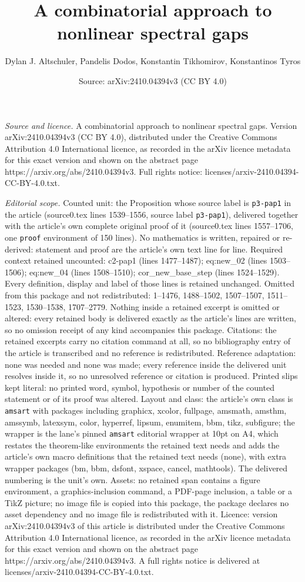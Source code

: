 \documentclass[10pt,a4paper]{amsart}
\title[A combinatorial approach to nonlinear spectral gaps]{A combinatorial approach to nonlinear spectral gaps}
\author{Dylan J. Altschuler, Pandelis Dodos, Konstantin Tikhomirov, Konstantinos Tyros}
\date{Source: arXiv:2410.04394v3 (CC BY 4.0)}
\begin{document}
\maketitle

\noindent\emph{Source and licence.} A combinatorial approach to nonlinear spectral gaps. Version arXiv:2410.04394v3 (CC BY 4.0), distributed under the Creative Commons Attribution 4.0 International licence, as recorded in the arXiv licence metadata for this exact version and shown on the abstract page https://arxiv.org/abs/2410.04394v3. Full rights notice: licenses/arxiv-2410.04394-CC-BY-4.0.txt.\par\smallskip

\noindent\textit{Editorial scope.} Counted unit: the Proposition whose source label is \texttt{p3-pap1} in the article (source0.tex lines 1539--1556, source label \texttt{p3-pap1}), delivered together with the article's own complete original proof of it (source0.tex lines 1557--1706, one \texttt{proof} environment of 150 lines). No mathematics is written, repaired or re-derived: statement and proof are the article's own text line for line. Required context retained uncounted: c2-pap1 (lines 1477--1487); eq:new\_02 (lines 1503--1506); eq:new\_04 (lines 1508--1510); cor\_new\_base\_step (lines 1524--1529). Every definition, display and label of those lines is retained unchanged. Omitted from this package and not redistributed: 1--1476, 1488--1502, 1507--1507, 1511--1523, 1530--1538, 1707--2779. Nothing inside a retained excerpt is omitted or altered: every retained body is delivered exactly as the article's lines are written, so no omission receipt of any kind accompanies this package. Citations: the retained excerpts carry no citation command at all, so no bibliography entry of the article is transcribed and no reference is redistributed. Reference adaptation: none was needed and none was made; every reference inside the delivered unit resolves inside it, so no unresolved reference or citation is produced. Printed slips kept literal: no printed word, symbol, hypothesis or number of the counted statement or of its proof was altered. Layout and class: the article's own class is \texttt{amsart} with packages including graphicx, xcolor, fullpage, amsmath, amsthm, amssymb, latexsym, color, hyperref, lipsum, enumitem, bbm, tikz, subfigure; the wrapper is the lane's pinned \texttt{amsart} editorial wrapper at 10pt on A4, which restates the theorem-like environments the retained text needs and adds the article's own macro definitions that the retained text needs (none), with extra wrapper packages (bm, bbm, dsfont, xspace, cancel, mathtools). The delivered numbering is the unit's own. Assets: no retained span contains a figure environment, a graphics-inclusion command, a PDF-page inclusion, a table or a TikZ picture; no image file is copied into this package, the package declares no asset dependency and no image file is redistributed with it. Licence: version arXiv:2410.04394v3 of this article is distributed under the Creative Commons Attribution 4.0 International licence, as recorded in the arXiv licence metadata for this exact version and shown on the abstract page https://arxiv.org/abs/2410.04394v3. A full rights notice is delivered at licenses/arxiv-2410.04394-CC-BY-4.0.txt. 
\end{document}
